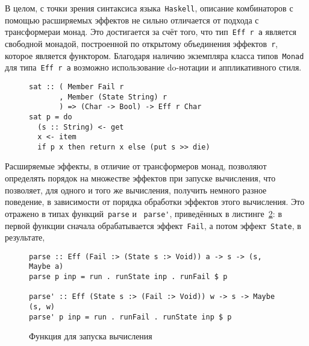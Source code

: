   В целом, с точки зрения синтаксиса языка~\lstinline{Haskell}, описание 
  комбинаторов с помощью расширяемых эффектов не сильно отличается от 
  подхода с трансформераи монад. Это достигается за счёт того, что 
  тип~\lstinline{Eff r a} является свободной монадой, построенной по открытому 
  объединения эффектов~\lstinline{r}, которое является функтором. Благодаря
  наличию экземпляра класса типов~\lstinline{Monad} для типа~\lstinline{Eff r a}
  возможно использование do-нотации и аппликативного стиля.

  \begin{figure}[h]
  \begin{lstlisting}
sat :: ( Member Fail r
       , Member (State String) r
       ) => (Char -> Bool) -> Eff r Char
sat p = do
  (s :: String) <- get
  x <- item
  if p x then return x else (put s >> die)
  \end{lstlisting}
  \label{listing:extEffSat}
  \end{figure} 

  Расширяемые эффекты, в отличие от трансформеров монад, позволяют определять 
  порядок на множестве эффектов при запуске вычисления, что позволяет, для 
  одного и того же вычисления, получить немного разное поведение, в зависимости от
  порядка обработки эффектов этого вычисления. Это отражено в 
  типах функций~\lstinline{parse} и ~\lstinline{parse'}, приведённых в 
  листинге~\ref{listing:extEffparse}: в первой функции сначала обрабатывается 
  эффект~\lstinline{Fail}, а потом эффект~\lstinline{State}, в результате,  

  \begin{figure}[h]
  \begin{lstlisting}
parse :: Eff (Fail :> (State s :> Void)) a -> s -> (s, Maybe a)
parse p inp = run . runState inp . runFail $ p

parse' :: Eff (State s :> (Fail :> Void)) w -> s -> Maybe (s, w)
parse' p inp = run . runFail . runState inp $ p 
  \end{lstlisting}
  \caption{Функция для запуска вычисления}
  \label{listing:extEffparse}
  \end{figure}

